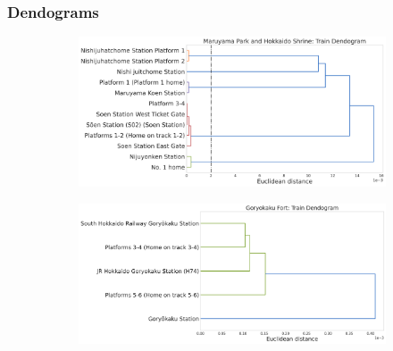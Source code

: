 \documentclass[11pt]{article}
\begin{document}
    \hypertarget{dendograms}{%
\subsubsection{Dendograms}\label{dendograms}}

\begin{figure}[H]
  \centering
  \begin{subfigure}[t]{0.45\textwidth}
    \centering
    \includegraphics[width=\textwidth]{images/Maruyama Park and Hokkaido Shrine__threshold.png}
  \end{subfigure}
  \hfill
  \begin{subfigure}[t]{0.49\textwidth}
    \centering
    \includegraphics[width=\textwidth]{images/Goryokaku Fort__threshold.png}
  \end{subfigure}


\end{figure}
\end{document}
